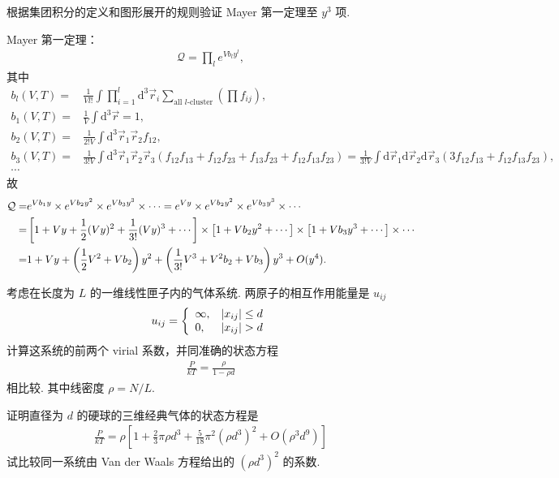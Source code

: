 \documentclass{assignment}
\begin{document}
\begin{prob}
    根据集团积分的定义和图形展开的规则验证 Mayer 第一定理至 $y^3$ 项.
\end{prob}
\begin{pf}
    Mayer 第一定理：
    \begin{align}
        \mathcal{Q}=\prod_le^{Vb_ly^l},
    \end{align}
    其中
    \begin{align}
        b_l(V,T)=&\frac{1}{Vl!}\int\prod_{i=1}^l\mathrm{d}^3\vec{r}_i\sum_{\text{all $l$-cluster}}\left(\prod f_{ij}\right),\\
        b_1(V,T)=&\frac{1}{V}\int\mathrm{d}^3\vec{r}=1,\\
        b_2(V,T)=&\frac{1}{2!V}\int\mathrm{d}^3\vec{r}_1\vec{r}_2f_{12},\\
        b_3(V,T)=&\frac{1}{3!V}\int\mathrm{d}^3\vec{r}_1\vec{r}_2\vec{r}_3(f_{12}f_{13}+f_{12}f_{23}+f_{13}f_{23}+f_{12}f_{13}f_{23})=\frac{1}{3!V}\int\mathrm{d}\vec{r}_1\mathrm{d}\vec{r}_2\mathrm{d}\vec{r}_3(3f_{12}f_{13}+f_{12}f_{13}f_{23}),\\
        \cdots&
    \end{align}
    故
    \begin{align}
        \notag\mathcal{Q}=&e^{Vb_1y}\times e^{Vb_2y^2}\times e^{Vb_3y^3}\times\cdots=e^{Vy}\times e^{Vb_2y^2}\times e^{Vb_3y^3}\times\cdots\\
        \notag=&\left[1+Vy+\frac{1}{2}(Vy)^2+\frac{1}{3!}(Vy)^3+\cdots\right]\times\left[1+Vb_2y^2+\cdots\right]\times\left[1+Vb_3y^3+\cdots\right]\times\cdots\\
        =&1+Vy+\left(\frac{1}{2}V^2+Vb_2\right)y^2+\left(\frac{1}{3!}V^3+V^2b_2+Vb_3\right)y^3+O(y^4).
    \end{align}
\end{pf}

\begin{prob}
    考虑在长度为 $L$ 的一维线性匣子内的气体系统. 两原子的相互作用能量是 $u_{ij}$
    \begin{align}
        u_{ij}=\left\{\begin{array}{ll}
            \infty,&\left\lvert x_{ij}\right\rvert\leq d\\
            0,&\left\lvert x_{ij}\right\rvert>d
        \end{array}\right.
    \end{align}
    计算这系统的前两个 virial 系数，并同准确的状态方程
    \begin{align}
        \frac{P}{kT}=\frac{\rho}{1-\rho d}
    \end{align}
    相比较. 其中线密度 $\rho=N/L$.
\end{prob}
\begin{sol}
    
\end{sol}

\begin{prob}
    证明直径为 $d$ 的硬球的三维经典气体的状态方程是
    \begin{align}
        \frac{P}{kT}=\rho\left[1+\frac{2}{3}\pi\rho d^3+\frac{5}{18}\pi^2(\rho d^3)^2+O(\rho^3d^9)\right]
    \end{align}
    试比较同一系统由 Van der Waals 方程给出的 $(\rho d^3)^2$ 的系数.
\end{prob}
\begin{pf}

\end{pf}
\end{document}
